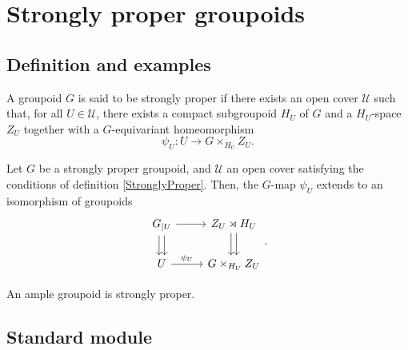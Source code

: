 \section{Strongly proper groupoids}

\subsection{Definition and examples}
\begin{definition}\label{StronglyProper}
A groupoid $G$ is said to be strongly proper if there exists an open cover $\mathcal U$ such that, for all $U\in\mathcal U$, there exists a compact subgroupoid $H_U$ of $G$ and a $H_U$-space $Z_U$ together with a $G$-equivariant homeomorphism
\[\psi_U : U \rightarrow G\times_{H_U} Z_U.\] 
\end{definition}

\begin{prop}
Let $G$ be a strongly proper groupoid, and $\mathcal U$ an open cover satisfying the conditions of definition \ref{StronglyProper}. Then, the $G$-map $\psi_U $ extends to an isomorphism of groupoids
\[\begin{tikzcd}
 G_{|U}\arrow{r}\arrow[shift right]{d}\arrow[shift left]{d} & Z_U\rtimes H_U \arrow[shift right]{d}\arrow[shift left]{d} \\
  U \arrow{r}{\psi_U} & G\times_{H_U} Z_U 
\end{tikzcd}.\]
\end{prop}

An ample groupoid is strongly proper.

\subsection{Standard module}






